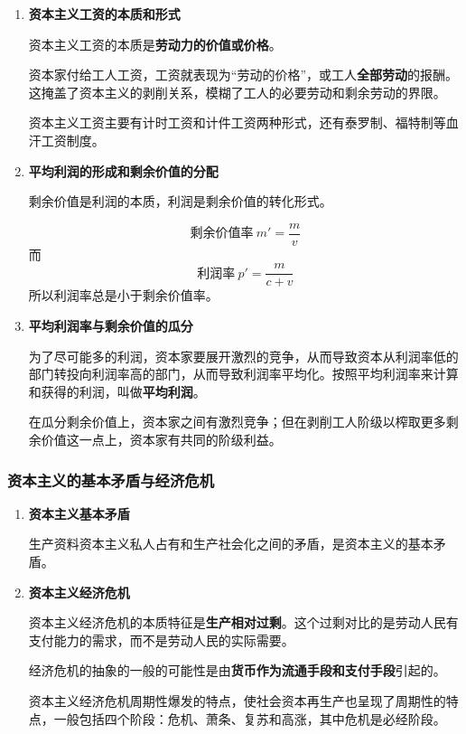 \documentclass[12pt, a4paper, oneside]{ctexart}
\begin{document}
\begin{enumerate}
  \item {\bf 资本主义工资的本质和形式}
  
  资本主义工资的本质是\textbf{劳动力的价值或价格}。

  资本家付给工人工资，工资就表现为“劳动的价格”，或工人\textbf{全部劳动}的报酬。这掩盖了资本主义的剥削关系，模糊了工人的必要劳动和剩余劳动的界限。

  资本主义工资主要有计时工资和计件工资两种形式，还有泰罗制、福特制等血汗工资制度。

  \item {\bf 平均利润的形成和剩余价值的分配}
  
  剩余价值是利润的本质，利润是剩余价值的转化形式。

  \begin{equation*}
    \text{剩余价值率}\ m'=\frac{m}{v}
  \end{equation*}
  而
  \begin{equation*}
    \text{利润率}\ p'=\frac{m}{c+v}
  \end{equation*}
  所以利润率总是小于剩余价值率。

  \item {\bf 平均利润率与剩余价值的瓜分}
  
  为了尽可能多的利润，资本家要展开激烈的竞争，从而导致资本从利润率低的部门转投向利润率高的部门，从而导致利润率平均化。按照平均利润率来计算和获得的利润，叫做\textbf{平均利润}。

  在瓜分剩余价值上，资本家之间有激烈竞争；但在剥削工人阶级以榨取更多剩余价值这一点上，资本家有共同的阶级利益。

\end{enumerate}

\subsubsection{资本主义的基本矛盾与经济危机}

\begin{enumerate}
  \item {\bf 资本主义基本矛盾}
  
  生产资料资本主义私人占有和生产社会化之间的矛盾，是资本主义的基本矛盾。

  \item {\bf 资本主义经济危机}
  
  资本主义经济危机的本质特征是\textbf{生产相对过剩}。这个过剩对比的是劳动人民有支付能力的需求，而不是劳动人民的实际需要。

  经济危机的抽象的一般的可能性是由\textbf{货币作为流通手段和支付手段}引起的。

  资本主义经济危机周期性爆发的特点，使社会资本再生产也呈现了周期性的特点，一般包括四个阶段：危机、萧条、复苏和高涨，其中危机是必经阶段。

\end{enumerate}
\end{document}
